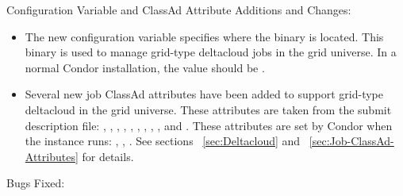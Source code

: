 \noindent Configuration Variable and ClassAd Attribute Additions and Changes:

\begin{itemize}

\item The new configuration variable  specifies
where the  binary is located. This binary is used to
manage grid-type deltacloud jobs in the grid universe.
In a normal Condor installation, the value should be
.

\item Several new job ClassAd attributes have been added to support
grid-type deltacloud in the grid universe.
These attributes are taken from the submit description file:
,
,
,
,
,
,
,
,
, and
.
These attributes are set by Condor when the instance runs:
,
,
.
See sections ~\ref{sec:Deltacloud} and ~\ref{sec:Job-ClassAd-Attributes}
for details.

\end{itemize}

\noindent Bugs Fixed:

